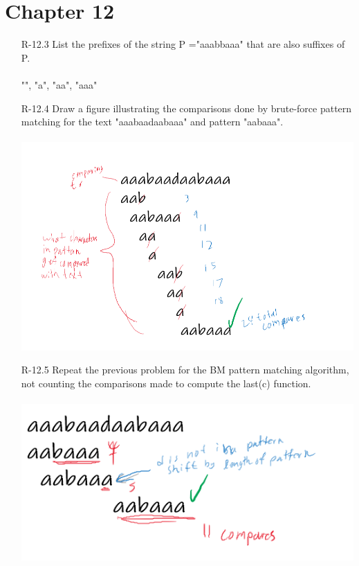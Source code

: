 \section{Chapter 12}

\begin{itemize}

      \item[R-12.3] List the prefixes of the string P ="aaabbaaa" that are also suffixes of P.\\
            \answer \\
            "", "a", "aa", "aaa"
      \item [R-12.4] Draw a figure illustrating the comparisons done by brute-force pattern
            matching for the text "aaabaadaabaaa" and pattern "aabaaa". \\
            \answer \\
            \includegraphics[scale = .6]{img/R-12_4.png}
      \item[R-12.5] Repeat the previous problem for the BM pattern matching algorithm, not
            counting the comparisons made to compute the last(c) function. \\
            \answer \\
            \includegraphics[scale = 0.6]{img/R-12_5.png}

\end{itemize}
